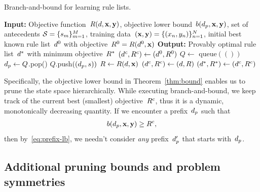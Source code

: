 \begin{algorithm}[t!]
\caption{Branch-and-bound for learning rule lists.}
\label{alg:branch-and-bound}
\begin{algorithmic}
\normalsize
\State \textbf{Input:} Objective function~$R({d}, \mathbf{x}, \mathbf{y})$,
objective lower bound~${b(d_p, \mathbf{x}, \mathbf{y})}$,
set of antecedents ${{\mathcal S} = \{s_m\}_{m=1}^M}$,
training data~$(\mathbf{x}, \mathbf{y}) = {\{(x_n, y_n)\}_{n=1}^N}$,
initial best known rule list~$d^0$ with objective~${R^0 = R(d^0, \mathbf{x})}$
\State \textbf{Output:} Provably optimal rule list~$d^*$ with minimum objective~$R^*$
\State $(d^c, R^c) \gets (d^0, R^0)$ 
\State $Q \gets $ queue$(())$ 
 
	\State $d_p \gets Q$.pop() 
	 
         
            \State $Q$.push$((d_p, s))$ 
        \EndFor
        \State $R \gets R({d}, \mathbf{x})$ 
        \If {$\Obj < \CurrentObj$}
            \State $(d^c, R^c) \gets ({d}, R)$ 
        \EndIf
    \EndIf
\EndWhile
\State $(d^*, R^*) \gets (d^c, R^c)$ 
\end{algorithmic}
\end{algorithm}

Specifically, the objective lower bound in Theorem~\ref{thm:bound}
enables us to prune the state space hierarchically.
%
While executing branch-and-bound, we keep track of the current best (smallest)
objective~$R^c$, thus it is a dynamic, monotonically decreasing quantity.
%
If we encounter a prefix~$d_p$ such that
\begin{align}
b(\Prefix, \x, \y) \ge \CurrentObj,
\end{align}
then by~\eqref{eq:prefix-lb}, we needn't consider \emph{any} prefix~$d_p'$
that starts with~$d_p$.

\subsection{Additional pruning bounds and problem symmetries}

